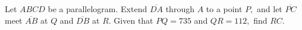 Let $ABCD$ be a parallelogram.  Extend $\overline{DA}$ through $A$ to a point $P,$ and let $\overline{PC}$ meet $\overline{AB}$ at $Q$ and $\overline{DB}$ at $R.$  Given that $PQ=735$ and $QR=112,$ find $RC.$
